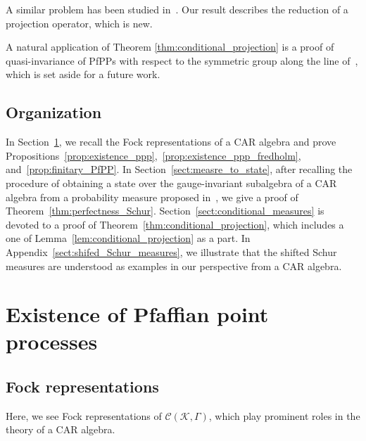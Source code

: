 \documentclass[pdftex]{sigma}
\numberwithin{equation}{section}
\newcommand{\mcal}[1]{\mathcal{#1}}
\begin{document}
 \begin{Remark}
A similar problem has been studied in~\cite{BufetovCundenQiu2019}. Our result describes the reduction of a projection operator, which is new.
 \end{Remark}

 A natural application of Theorem \ref{thm:conditional_projection} is a proof of quasi-invariance of PfPPs with respect to the symmetric group along the line of~\cite{BufetovOlshanski2019,Olshanski2011,Olshanski2020}, which is set aside for a future work.

 \subsection*{Organization}
 In Section~\ref{sect:existence_PfPP}, we recall the Fock representations of a CAR algebra and prove Propositions~\ref{prop:existence_ppp},~\ref{prop:existence_ppp_fredholm}, and~\ref{prop:finitary_PfPP}.
 In Section~\ref{sect:measre_to_state}, after recalling the procedure of obtaining a state over the gauge-invariant subalgebra of a CAR algebra from a probability measure proposed in~\cite{Olshanski2020}, we give a proof of Theorem~\ref{thm:perfectness_Schur}.
 Section~\ref{sect:conditional_measures} is devoted to a proof of Theorem~\ref{thm:conditional_projection}, which includes a one of Lemma~\ref{lem:conditional_projection} as a part.
 In Appendix~\ref{sect:shifed_Schur_measures}, we illustrate that the shifted Schur measures are understood as examples in our perspective from a CAR algebra.

\section{Existence of Pfaffian point processes} \label{sect:existence_PfPP}
\subsection{Fock representations}
Here, we see Fock representations of $\mcal{C}(\mcal{K},\Gamma)$, which play prominent roles in the theory of a CAR algebra.
\end{document}
